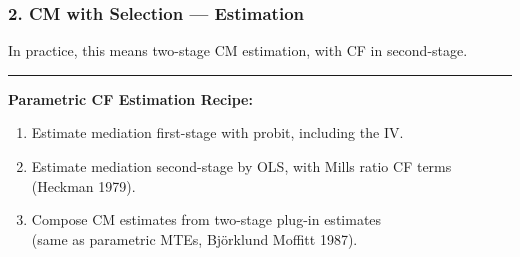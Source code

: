 \documentclass[dvipsnames]{beamer} %
\begin{document}
\begin{frame}
    \frametitle{2. CM with Selection --- Estimation}
    In practice, this means two-stage CM estimation, with CF in second-stage.

    \par\noindent\rule{\textwidth}{0.4pt}
    \textbf{Parametric CF Estimation Recipe:}
    \begin{enumerate}
        \item Estimate mediation first-stage with probit, including the IV.
        \item Estimate mediation second-stage by OLS, with Mills ratio CF terms (Heckman 1979).
        \item Compose CM estimates from two-stage plug-in estimates
        \\(same as parametric MTEs, Bj{\"o}rklund Moffitt 1987).
    \end{enumerate}

    \vskip0.5cm

    \vfill
\end{frame}
\end{document}
